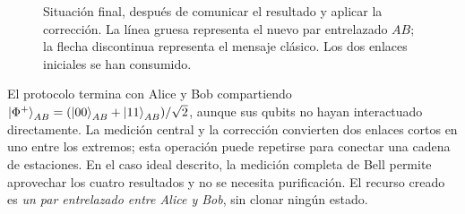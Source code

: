 \documentclass[letterpaper,12pt]{article}
\numberwithin{equation}{section}
\begin{document}
\begin{figure}[H]
\centering
{}
\caption{Situación final, después de comunicar el resultado y aplicar la
corrección. La línea gruesa representa el nuevo par entrelazado $AB$;
la flecha discontinua representa el mensaje clásico. Los dos enlaces
iniciales se han consumido.}
\label{fig:enlace-final}
\end{figure}

El protocolo termina con Alice y Bob compartiendo
${\vert \Phi^+ \rangle}_{AB}=({\vert 00 \rangle}_{AB}+{\vert 11 \rangle}_{AB})/\sqrt2$, aunque sus
qubits no hayan interactuado directamente. La medición central y la
corrección convierten dos enlaces cortos en uno entre los extremos;
esta operación puede repetirse para conectar una cadena de estaciones.
En el caso ideal descrito, la medición completa de Bell permite aprovechar
los cuatro resultados y no se necesita purificación. El recurso creado es
\emph{un par entrelazado entre Alice y Bob}, sin clonar ningún estado.

\clearpage

\end{document}
